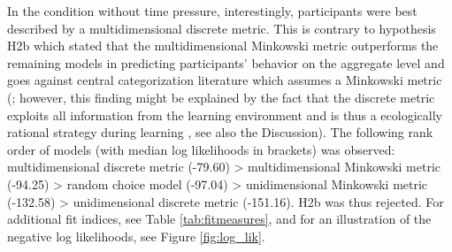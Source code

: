 \documentclass[a4paper,man,natbib]{apa6}
\begin{document}
In the condition without time pressure, interestingly, participants were best described by a multidimensional discrete metric. This is contrary to hypothesis H2b which stated that the multidimensional Minkowski metric outperforms the remaining models in predicting participants' behavior on the aggregate level and goes against central categorization literature which assumes a Minkowski metric (\citealp{nosofsky1986attention, nosofsky1989further, nosofsky1994rule, nosofsky1984choice}; however, this finding might be explained by the fact that the discrete metric exploits all information from the learning environment and is thus a ecologically rational strategy during learning \citealp{todd2007environments}, see also the Discussion).
The following rank order of models (with median log likelihoods in brackets) was observed: multidimensional discrete metric (-79.60) > multidimensional Minkowski metric (-94.25) > random choice model (-97.04) > unidimensional Minkowski metric (-132.58) > unidimensional discrete metric (-151.16). H2b was thus rejected. For additional fit indices, see Table \ref{tab:fitmeasures}, and for an illustration of the negative log likelihoods, see Figure \ref{fig:log_lik}.
\end{document}
